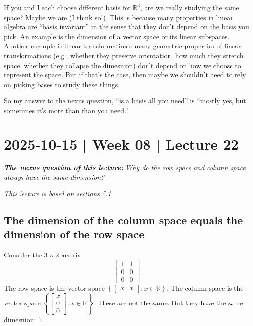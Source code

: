 \documentclass[10pt]{article}
\theoremstyle{definition}
\newcommand{\R}{\mathbb{R}}           %
\begin{document}
If you and I each choose different basis for $\R^{3}$, are we really studying
the same space? Maybe we are (I think so!). This is because many properties in
linear algebra are ``basis invariant'' in the sense that they don't depend on
the basis you pick. An example is the dimension of a vector space or its
linear subspaces. Another example is linear transformations: many geometric
properties of linear transformations (e.g., whether they preserve orientation,
how much they stretch space, whether they collapse the dimesnion) don't depend
on how we choose to represent the space. But if that's the case, then maybe we
shouldn't need to rely on picking bases to study these things.

So my answer to the nexus question, ``is a basis all you need'' is ``mostly
yes, but sometimes it's more than than you need.''

\newpage
\section{2025-10-15 | Week 08 | Lecture 22}
\begin{center}
  \begin{tcolorbox}[width=0.9\textwidth, colback=white, colframe=black]
    \textit{\textbf{The nexus question of this lecture:} Why do the row space
      and column space always have the same dimension?}
  \end{tcolorbox}
\end{center}
\textit{This lecture is based on sections 5.1}

\subsection{The dimension of the column space equals the dimension of the row space}

Consider the $3\times 2$ matrix
\begin{equation*}
  \begin{bmatrix}
    1&1\\
    0&0\\
    0&0
  \end{bmatrix}
\end{equation*}
The row space is the vector space $\left\{
  \begin{bmatrix}
    x&x
  \end{bmatrix}
  : x\in \R
\right\}$.
The column space is the vector space $\left\{
  \begin{bmatrix}
    x\\0\\0
  \end{bmatrix}: x\in \R
\right\}$. These are not the same. But they have the same dimesnion: 1.
\end{document}
